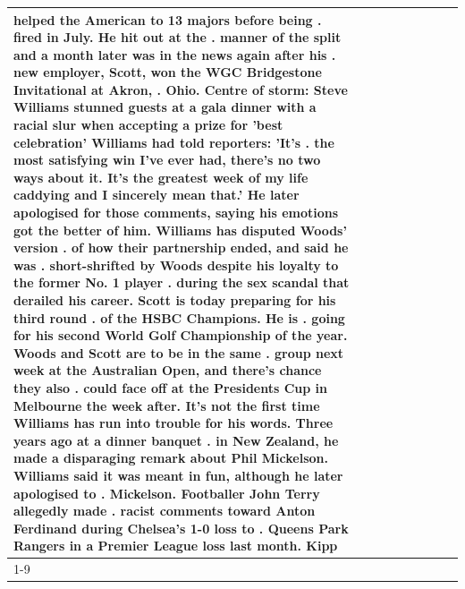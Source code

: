 \begin{table}[H]
\begin{tabular}{lllrlllll}
helped the American to 13 majors before being . fired in July. He hit out at the . manner of the split and a month later was in the news again after his . new employer, Scott, won the WGC Bridgestone Invitational at Akron, . Ohio. Centre of storm: Steve Williams stunned guests at a gala dinner with a racial slur when accepting a prize for 'best celebration' Williams had told reporters: 'It's . the most satisfying win I've ever had, there's no two ways about it. It's the greatest week of my life caddying and I sincerely mean that.' He later apologised for those comments, saying his emotions got the better of him. Williams has disputed Woods' version . of how their partnership ended, and said he was . short-shrifted by Woods despite his loyalty to the former No. 1 player . during the sex scandal that derailed his career. Scott is today preparing for his third round . of the HSBC Champions. He is . going for his second World Golf Championship of the year. Woods and Scott are to be in the same . group next week at the Australian Open, and there's chance they also . could face off at the Presidents Cup in Melbourne the week after. It's not the first time Williams has run into trouble for his words. Three years ago at a dinner banquet . in New Zealand, he made a disparaging remark about Phil Mickelson. Williams said it was meant in fun, although he later apologised to . Mickelson. Footballer John Terry allegedly made . racist comments toward Anton Ferdinand during Chelsea's 1-0 loss to . Queens Park Rangers in a Premier League loss last month. Kipp \\
\cline{1-9}

\end{tabular}
\end{table}
